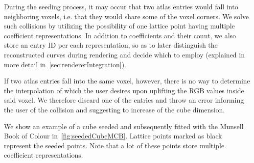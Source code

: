 During the seeding process, it may occur that two atlas entries would fall into neighboring voxels, i.e. that they would share some of the voxel corners. We solve such collisions by utilizing the possibility of one lattice point having multiple coefficient representations. In addition to coefficients and their count, we also store an entry ID per each representation, so as to later distinguish the reconstructed curves during rendering and decide which to employ (explained in more detail in~\cref{sec:rendererIntegration}).

If two atlas entries fall into the same voxel, however, there is no way to determine the interpolation of which the user desires upon uplifting the RGB values inside said voxel. We therefore discard one of the entries and throw an error informing the user of the collision and suggesting to increase of the cube dimension.

We show an example of a cube seeded and subsequently fitted with the Munsell Book of Colour in~\cref{fig:seededCubeMCB}. Lattice points marked as black represent the seeded points. Note that a lot of these points store multiple coefficient representations.

